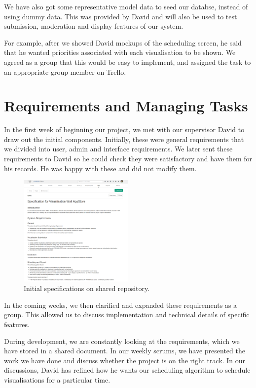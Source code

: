 \documentclass[a4paper]{article}
\begin{document}
We have also got some representative model data to seed our databse, 
instead of using dummy data. This was provided by David and will also be 
used to test submission, moderation and display features of our system.

For example, after we showed David mockups of the scheduling screen, he said that 
he wanted priorities associated with each visualisation to be shown. We agreed as a 
group that this would be easy to implement, and assigned the task to an appropriate
group member on Trello. 


\section{Requirements and Managing Tasks}
In the first week of beginning our project, we met with our supervisor 
David to draw out the initial components. Initially, these were general
requirements that we divided into user, admin and interface 
requirements. We later sent these requirements to David so he could check
they were satisfactory and have them for his records. He was happy with 
these and did not modify them.



\begin{figure}[H]
  \centering
    \includegraphics[width = 0.5\textwidth]{./evaluation/specs.png}

  \caption{Initial specifications on shared repository.}
  \label{fig:specs}
\end{figure}



In the coming weeks, we then clarified and expanded these requirements as 
a group. This allowed us to discuss implementation and technical details
of specific features.

During development, we are constantly looking at the requirements, which 
we have stored in a shared document. In our weekly scrums, we have 
presented the work we have done and discuss whether the project is on the 
right track. In our discussions, David has refined how he wants our
scheduling algorithm to schedule visualisations for a particular time. 
\end{document}

